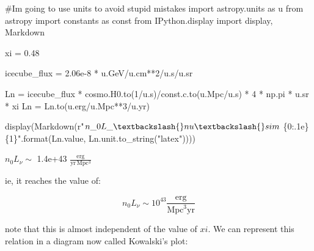 \documentclass[
  letterpaper,
  DIV=11,
  numbers=noendperiod]{scrreprt}
\newenvironment{Shaded}{\begin{snugshade}}{\end{snugshade}}
\newcommand{\BuiltInTok}[1]{\textcolor[rgb]{0.00,0.23,0.31}{#1}}
\newcommand{\CommentTok}[1]{\textcolor[rgb]{0.37,0.37,0.37}{#1}}
\newcommand{\DecValTok}[1]{\textcolor[rgb]{0.68,0.00,0.00}{#1}}
\newcommand{\FloatTok}[1]{\textcolor[rgb]{0.68,0.00,0.00}{#1}}
\newcommand{\ImportTok}[1]{\textcolor[rgb]{0.00,0.46,0.62}{#1}}
\newcommand{\NormalTok}[1]{\textcolor[rgb]{0.00,0.23,0.31}{#1}}
\newcommand{\OperatorTok}[1]{\textcolor[rgb]{0.37,0.37,0.37}{#1}}
\newcommand{\SpecialCharTok}[1]{\textcolor[rgb]{0.37,0.37,0.37}{#1}}
\newcommand{\StringTok}[1]{\textcolor[rgb]{0.13,0.47,0.30}{#1}}
\newcommand{\VerbatimStringTok}[1]{\textcolor[rgb]{0.13,0.47,0.30}{#1}}
\begin{document}
\begin{Shaded}
\begin{Highlighting}[]
\CommentTok{\#I\textquotesingle{}m going to use units to avoid stupid mistakes}
\ImportTok{import}\NormalTok{ astropy.units }\ImportTok{as}\NormalTok{ u}
\ImportTok{from}\NormalTok{ astropy }\ImportTok{import}\NormalTok{ constants }\ImportTok{as}\NormalTok{ const}
\ImportTok{from}\NormalTok{ IPython.display }\ImportTok{import}\NormalTok{ display, Markdown}

\NormalTok{xi }\OperatorTok{=} \FloatTok{0.48}

\NormalTok{icecube\_flux }\OperatorTok{=} \FloatTok{2.06e{-}8} \OperatorTok{*}\NormalTok{ u.GeV}\OperatorTok{/}\NormalTok{u.cm}\OperatorTok{**}\DecValTok{2}\OperatorTok{/}\NormalTok{u.s}\OperatorTok{/}\NormalTok{u.sr}

\NormalTok{Ln }\OperatorTok{=}\NormalTok{ icecube\_flux }\OperatorTok{*}\NormalTok{ cosmo.H0.to(}\DecValTok{1}\OperatorTok{/}\NormalTok{u.s)}\OperatorTok{/}\NormalTok{const.c.to(u.Mpc}\OperatorTok{/}\NormalTok{u.s) }\OperatorTok{*} \DecValTok{4} \OperatorTok{*}\NormalTok{ np.pi }\OperatorTok{*}\NormalTok{ u.sr }\OperatorTok{*}\NormalTok{ xi}
\NormalTok{Ln }\OperatorTok{=}\NormalTok{ Ln.to(u.erg}\OperatorTok{/}\NormalTok{u.Mpc}\OperatorTok{**}\DecValTok{3}\OperatorTok{/}\NormalTok{u.yr)}

\NormalTok{display(Markdown(}\VerbatimStringTok{r"$n\_0 L\_\textbackslash{}nu \textbackslash{}sim$ }\SpecialCharTok{\{0:.1e\}}\VerbatimStringTok{ }\SpecialCharTok{\{1\}}\VerbatimStringTok{"}\NormalTok{.}\BuiltInTok{format}\NormalTok{(Ln.value, Ln.unit.to\_string(}\StringTok{"latex"}\NormalTok{))))}
\end{Highlighting}
\end{Shaded}

\(n_0 L_\nu \sim\) 1.4e+43 \(\mathrm{\frac{erg}{yr\,Mpc^{3}}}\)

ie, it reaches the value of:

\[n_0 L_\nu \sim 10^{43} \frac{\mathrm{erg}}{\mathrm{Mpc}^3\mathrm{yr}}\]

note that this is almost independent of the value of \(xi\). We can
represent this relation in a diagram now called Kowalski's plot:
\end{document}
